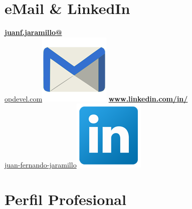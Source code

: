 \begin{aside}
    \section{eMail \& LinkedIn}
    \href{mailto:juanf.jaramillo@opdevel.com}{\small{\textbf{juanf.jaramillo@}\\opdevel.com}\includegraphics[scale=0.07]{img/email2.png}}
    \href{http:\\https://www.linkedin.com/in/juan-fernando-jaramillo/}{\textbf{www.linkedin.com/in/}\small{\\juan-fernando-jaramillo}\includegraphics[scale=0.07]{img/Linkedin.png}}
   ~
   ~
  \section{Perfil Profesional}
\end{aside}
